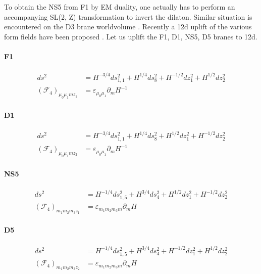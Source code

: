 To obtain the NS5 from F1 by EM duality, one actually has to perform an accompanying SL(2, Z) transformation to invert the dilaton.
Similar situation is encountered on the D3 brane worldvolume \cite{Tseytlin:1996it}.
Recently a 12d uplift of the various form fields have been proposed \cite{Cheng:2025efp}. Let us uplift the F1, D1, NS5, D5 branes to 12d.

\paragraph{F1}
\begin{align}
ds^2
&= H^{-3/4}ds_{1,1}^2 
+ H^{1/4}ds_8^2
+H^{-1/2}dz_1^2
+H^{1/2}dz_2^2\\
(\mathcal{F}_4)_{\mu_0 \mu_1 m z_1} 
&= \varepsilon_{\mu_0 \mu_1}\partial_m H^{-1}
\end{align}

\paragraph{D1}
\begin{align}
ds^2
&= H^{-3/4}ds_{1,1}^2 
+ H^{1/4}ds_8^2
+H^{1/2}dz_1^2
+H^{-1/2}dz_2^2\\
(\mathcal{F}_4)_{\mu_0 \mu_1 m z_2} 
&= \varepsilon_{\mu_0 \mu_1}\partial_m H^{-1}
\end{align}


\paragraph{NS5}
\begin{align}
ds^2
&= H^{-1/4}ds_{1,5}^2 
+ H^{3/4}ds_4^2
+H^{1/2}dz_1^2
+H^{-1/2}dz_2^2\\
(\mathcal{F}_4)_{m_1 m_2 m_3 z_1} 
&= \varepsilon_{m_1 m_2 m_3 m}\partial_m H
\end{align}

\paragraph{D5}
\begin{align}
ds^2
&= H^{-1/4}ds_{1,5}^2 
+ H^{3/4}ds_4^2
+H^{-1/2}dz_1^2
+H^{1/2}dz_2^2\\
(\mathcal{F}_4)_{m_1 m_2 m_3 z_2} 
&= \varepsilon_{m_1 m_2 m_3 m}\partial_m H
\end{align}

